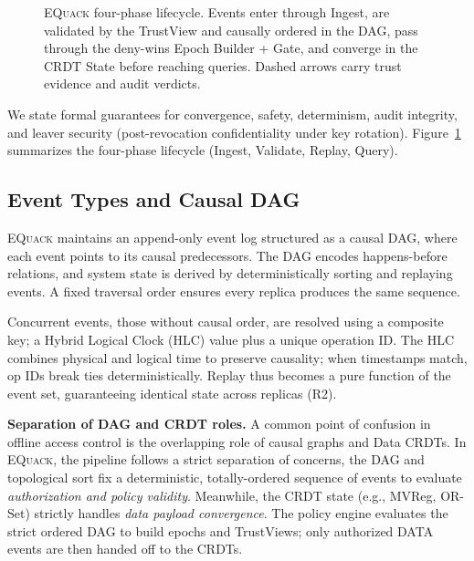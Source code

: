 \documentclass[10pt,journal,compsoc]{IEEEtran}
\newcommand{\equack}{\textsc{EQuack}}
\begin{document}
\begin{figure}[!t]
  \centering
  \caption{\equack{} four-phase lifecycle. Events enter through Ingest, are validated by the TrustView and causally ordered in the DAG, pass through the deny-wins Epoch Builder + Gate, and converge in the CRDT State before reaching queries. Dashed arrows carry trust evidence and audit verdicts.}
  \label{fig:ecac-overview}
\end{figure}

We state formal guarantees for convergence, safety, determinism, audit integrity, and leaver security (post-revocation confidentiality under key rotation). Figure~\ref{fig:ecac-overview} summarizes the four-phase lifecycle (Ingest, Validate, Replay, Query).

\subsection{Event Types and Causal DAG}

\equack{} maintains an append-only event log structured as a causal DAG, where each event points to its causal predecessors. The DAG encodes happens-before relations, and system state is derived by deterministically sorting and replaying events. A fixed traversal order ensures every replica produces the same sequence.

Concurrent events, those without causal order, are resolved using a composite key; a Hybrid Logical Clock (HLC) value plus a unique operation ID. The HLC combines physical and logical time to preserve causality; when timestamps match, op IDs break ties deterministically. Replay thus becomes a pure function of the event set, guaranteeing identical state across replicas (R2). 

\textbf{Separation of DAG and CRDT roles.} A common point of confusion in offline access control is the overlapping role of causal graphs and Data CRDTs. In \equack{}, the pipeline follows a strict separation of concerns, the DAG and topological sort fix a deterministic, totally-ordered sequence of events to evaluate \textit{authorization and policy validity}. Meanwhile, the CRDT state (e.g., MVReg, OR-Set) strictly handles \textit{data payload convergence}. The policy engine evaluates the strict ordered DAG to build epochs and TrustViews; only authorized DATA events are then handed off to the CRDTs. 
\end{document}
